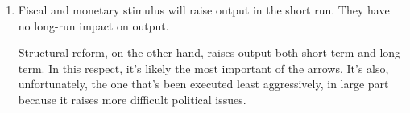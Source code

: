 \begin{enumerate}
\begin{enumerate}
\item Fiscal and monetary stimulus will raise output in the short run.
They have no long-run impact on output.

Structural reform, on the other hand, raises output both short-term and long-term.
In this respect, it's likely the most important of the arrows.
It's also, unfortunately, the one that's been executed least aggressively,
in large part because it raises more difficult political issues.
\end{enumerate}


%
%
%
%
%
%
%
%
%
\end{enumerate}


